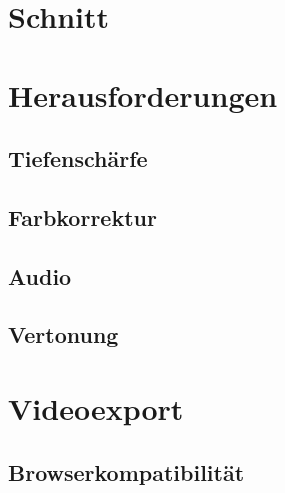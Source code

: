 \section{Schnitt}
\renewcommand{\kapitelautor}{Autor: Kerstin Schön}

\section{Herausforderungen}
\renewcommand{\kapitelautor}{Autor: Kerstin Schön}
\subsection{Tiefenschärfe}
\renewcommand{\kapitelautor}{Autor: Kerstin Schön}
\subsection{Farbkorrektur}
\renewcommand{\kapitelautor}{Autor: Kerstin Schön}
\subsection{Audio}
\renewcommand{\kapitelautor}{Autor: Kerstin Schön}
\subsection{Vertonung}
\renewcommand{\kapitelautor}{Autor: Kerstin Schön}

\section{Videoexport}
\renewcommand{\kapitelautor}{Autor: Kerstin Schön}
\subsection{Browserkompatibilität}
\renewcommand{\kapitelautor}{Autor: Kerstin Schön}
